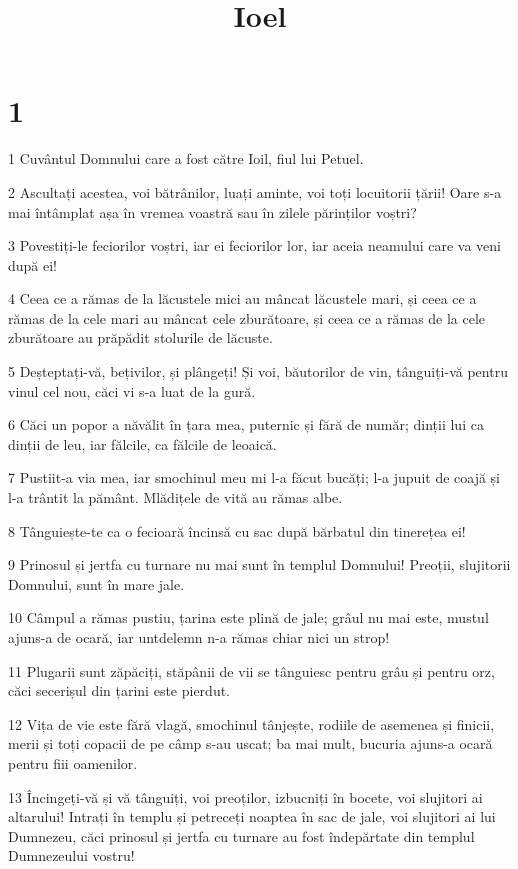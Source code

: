 

\title{Ioel}


\chapter{1}

\par 1 Cuvântul Domnului care a fost către Ioil, fiul lui Petuel.
\par 2 Ascultați acestea, voi bătrânilor, luați aminte, voi toți locuitorii țării! Oare s-a mai întâmplat așa în vremea voastră sau în zilele părinților voștri?
\par 3 Povestiți-le feciorilor voștri, iar ei feciorilor lor, iar aceia neamului care va veni după ei!
\par 4 Ceea ce a rămas de la lăcustele mici au mâncat lăcustele mari, și ceea ce a rămas de la cele mari au mâncat cele zburătoare, și ceea ce a rămas de la cele zburătoare au prăpădit stolurile de lăcuste.
\par 5 Deșteptați-vă, bețivilor, și plângeți! Și voi, băutorilor de vin, tânguiți-vă pentru vinul cel nou, căci vi s-a luat de la gură.
\par 6 Căci un popor a năvălit în țara mea, puternic și fără de număr; dinții lui ca dinții de leu, iar fălcile, ca fălcile de leoaică.
\par 7 Pustiit-a via mea, iar smochinul meu mi l-a făcut bucăți; l-a jupuit de coajă și l-a trântit la pământ. Mlădițele de vită au rămas albe.
\par 8 Tânguiește-te ca o fecioară încinsă cu sac după bărbatul din tinerețea ei!
\par 9 Prinosul și jertfa cu turnare nu mai sunt în templul Domnului! Preoții, slujitorii Domnului, sunt în mare jale.
\par 10 Câmpul a rămas pustiu, țarina este plină de jale; grâul nu mai este, mustul ajuns-a de ocară, iar untdelemn n-a rămas chiar nici un strop!
\par 11 Plugarii sunt zăpăciți, stăpânii de vii se tânguiesc pentru grâu și pentru orz, căci secerișul din țarini este pierdut.
\par 12 Vița de vie este fără vlagă, smochinul tânjește, rodiile de asemenea și finicii, merii și toți copacii de pe câmp s-au uscat; ba mai mult, bucuria ajuns-a ocară pentru fiii oamenilor.
\par 13 Încingeți-vă și vă tânguiți, voi preoților, izbucniți în bocete, voi slujitori ai altarului! Intrați în templu și petreceți noaptea în sac de jale, voi slujitori ai lui Dumnezeu, căci prinosul și jertfa cu turnare au fost îndepărtate din templul Dumnezeului vostru!
